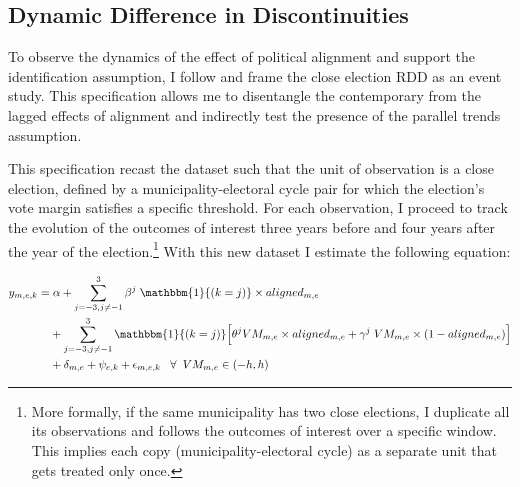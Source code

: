 \documentclass[dv_diss_main.tex]{subfiles}
\begin{document}
\subsection{Dynamic Difference in Discontinuities}
 
To observe the dynamics of the effect of political alignment and support the identification assumption, I follow \cite{cellini2010value} and frame the close election RDD as an event study. This specification allows me to disentangle the contemporary from the lagged effects of alignment and indirectly test the presence of the parallel trends assumption. 


This specification recast the dataset such that the unit of observation is a close election, defined  by a municipality-electoral cycle pair for which the election's vote margin satisfies a specific threshold. For each observation, I proceed to track the evolution of the outcomes of interest three years before and four years after the year of the election.\footnote{ More formally, if the same municipality has two close elections, I duplicate all its observations and follows the outcomes of interest over a specific window. This implies each copy (municipality-electoral cycle) as a separate unit that gets treated only once.} With this new dataset I estimate the following equation: 



\begin{equation}
\begin{split}
y_{m,e,k}= &\; \alpha + \sum_{j=-3, j\neq -1}^3  \beta^j \; \mathbbm{1}{(k=j)}\times aligned_{m,e} \\
& + \sum_{j=-3, j\neq -1}^3 \mathbbm{1}{(k=j)} \Big[ \theta^j VM_{m,e} \times aligned_{m,e} +   \gamma^j \; VM_{m,e}\times(1-aligned_{m,e}) \Big] \\
& +  \delta_{m,e} + \psi_{e,k}  + \epsilon_{m,e,k} \;\; \;\forall \;\; VM_{m,e} \in (-h, h) \label{eq:event}
\end{split}
\end{equation}
\end{document}
